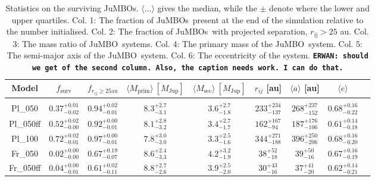 \documentclass[submission,phys]{lib/SciPost}
\newcommand{\erwan}[1] {{\texttt{\textbf{ERWAN: #1}}} }
\newcommand{\jumbo}{\mbox{JuMBO}}
\newcommand{\jumbos}{\mbox{JuMBOs}}
\begin{document}
\begin{table}
         \caption{Statistics on the surviving \jumbos. $\langle
           ...\rangle$ gives the median, while the $\pm$ denote where
           the lower and upper quartiles. Col. 1: The fraction of
           \jumbos\, present at the end of the simulation relative to
           the number initialised. Col. 2: The fraction of \jumbos\,
           with projected separation, $r_{\mathrm{ij}} > 25$
           au. Col. 3: The mass ratio of \jumbo\, systems. Col. 4: The
           primary mass of the \jumbo\, system. Col. 5: The semi-major
           axis of the \jumbo\, system. Col. 6: The eccentricity of
           the system.
           \erwan{should we get of the second column. Also, the caption needs work. I can do that.}
           }
        \label{Tab:SF_Res}
        \centering 
        \begin{tabular}{c c c c c c c c c}
        \hline\hline
        Model & $f_{\mathrm{surv}}$ & $f_{r_{ij} \geq 25\mathrm{ au}}$ & $\langle M_{\mathrm{prim}} \rangle\ [M_{\mathrm{Jup}}]$ & $\langle M_{\mathrm{sec}} \rangle\ [M_{\mathrm{Jup}}]$ & $r_{ij}$ [au] &$\langle a \rangle$ [au] & $\langle e \rangle$\\
        \hline \vspace{-0.75em}\\ 
           Pl\_050     & $0.37^{+0.01}_{-0.02}$ & $0.94^{+0.02}_{-0.01}$ & $8.3^{+2.7}_{-3.1}$ & $3.6^{+2.7}_{-1.8}$ & $233^{+234}_{-137}$ & $268^{+237}_{-152}$ & $0.68^{+0.16}_{-0.22}$ \vspace{0.25em}\\
           Pl\_050ff   & $0.52^{+0.02}_{-0.00}$ & $0.92^{+0.00}_{-0.01}$ & $8.1^{+2.8}_{-3.2}$ & $3.4^{+2.7}_{-1.7}$ & $162^{+167}_{-94}$ & $187^{+176}_{-106}$ & $0.61^{+0.14}_{-0.18}$ \vspace{0.25em}\\
           Pl\_100      & $0.72^{+0.02}_{-0.01}$ & $0.97^{+0.00}_{-0.01}$ & $7.8^{+3.0}_{-3.0}$ & $3.3^{+2.5}_{-1.6}$ & $344^{+271}_{-188}$ & $396^{+250}_{-206}$ & $0.68^{+0.16}_{-0.20}$ \vspace{0.25em}\\
           Fr\_050     & $0.02^{+0.00}_{-0.00}$ & $0.67^{+0.19}_{-0.07}$ & $8.6^{+2.4}_{-3.3}$ & $4.2^{+3.2}_{-1.9}$ & $38^{+52}_{-18}$ & $39^{+50}_{-16}$ & $0.67^{+0.16}_{-0.19}$ \vspace{0.25em}\\
           Fr\_050ff   & $0.04^{+0.00}_{-0.01}$ & $0.61^{+0.02}_{-0.11}$ & $8.8^{+2.7}_{-2.6}$ & $3.9^{+2.5}_{-2.0}$ & $30^{+43}_{-16}$ & $37^{+41}_{-20}$ & $0.62^{+0.14}_{-0.21}$ \vspace{0.25em}\\

\end{tabular}
\end{table}
\end{document}
